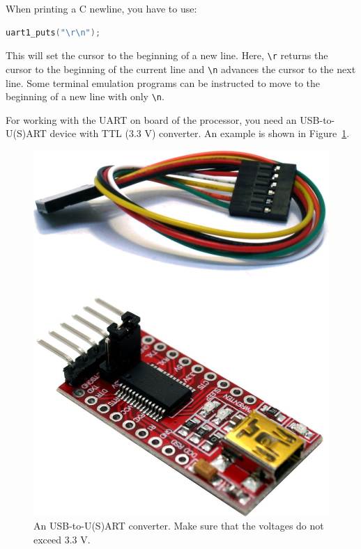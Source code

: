 \documentclass[12pt]{article}
\begin{document}
When printing a C newline, you have to use:

\begin{lstlisting}[language=C]
uart1_puts("\r\n");
\end{lstlisting}

This will set the cursor to the beginning of a new line. Here, \lstinline|\r| returns the cursor to the beginning of the current line and \lstinline|\n| advances the cursor to the next line. Some terminal emulation programs can be instructed to move to the beginning of a new line with only \lstinline|\n|.

For working with the UART on board of the processor, you need an USB-to-U(S)ART device with TTL (3.3 V) converter. An example is shown in Figure~\ref{fig:usb-usart-ttl}.

\begin{figure}[!ht]
\centering
\includegraphics[scale=0.1]{usb-usart-ttl}
\caption{An USB-to-U(S)ART converter. Make sure that the voltages do not exceed 3.3 V.}
\label{fig:usb-usart-ttl}
\end{figure}
\end{document}
